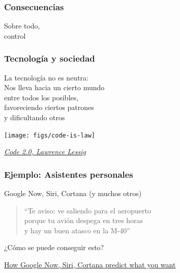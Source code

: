 \documentclass[17pt,aspectratio=169]{beamer}
\begin{document}
\begin{frame}
\frametitle{Consecuencias}

{\Huge
  \begin{center}
  Sobre todo,\\
  control\\
  \end{center}
}
\end{frame}


\begin{frame}
\frametitle{Tecnología y sociedad}

{\Large
La tecnología no es neutra: \\
Nos lleva hacia un cierto mundo \\
entre todos los posibles, \\
favoreciendo ciertos patrones \\
y dificultando otros \\
}

\end{frame}

\begin{frame}[fragile]

  \begin{center}
  \texttt{[image: figs/code-is-law]}
  \end{center}

  \begin{flushright}
    {\small \em
      \href{https://lessig.org/product/codev2}{Code 2.0, Lawrence Lessig} \\
      }
  \end{flushright}
  
\end{frame}



\begin{frame}
\frametitle{Ejemplo: Asistentes personales}

\begin{flushright}
  Google Now, Siri, Cortana (y muchos otros)
\end{flushright}

\begin{quote}
  ``Te aviso:
  ve saliendo para el aeropuerto \\
  porque tu avión despega en tres horas \\
  y hay un buen atasco en la M-40'' \\
\end{quote}

¿Cómo se puede conseguir esto?

\begin{flushright}
  {\tiny \href{http://searchengineland.com/how-google-now-siri-cortana-predict-what-you-want-229799}{How Google Now, Siri, Cortana predict what you want}}
\end{flushright}
\end{frame}
\end{document}
